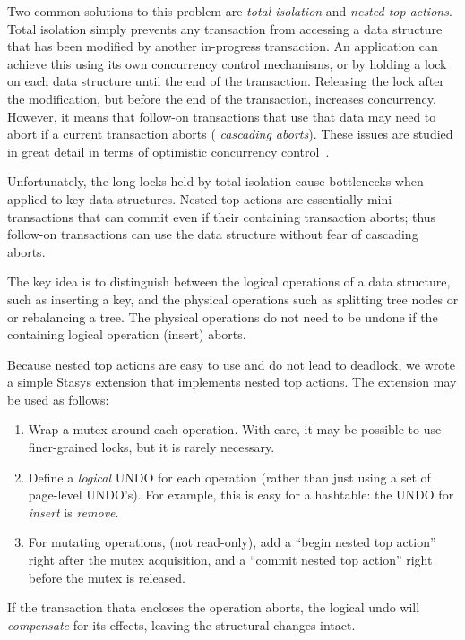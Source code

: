\documentclass[letterpaper,twocolumn,10pt]{article}
\newcommand{\yad}{Stasys\xspace}
\begin{document}
Two common solutions to this problem are {\em total isolation} and
{\em nested top actions}.  Total isolation simply prevents any
transaction from accessing a data structure that has been modified by
another in-progress transaction.  An application can achieve this
using its own concurrency control mechanisms, or by holding a lock on
each data structure until the end of the transaction.  Releasing the
lock after the modification, but before the end of the transaction,
increases concurrency.  However, it means that follow-on transactions that use
that data may need to abort if a current transaction aborts ({\em
cascading aborts}).  These issues are studied in great detail in terms of optimistic concurrency control~\cite{optimisticConcurrencyControl, optimisticConcurrenctPerformance}.

Unfortunately, the long locks held by total isolation cause bottlenecks when applied to key
data structures.
Nested top actions are essentially mini-transactions that can
commit even if their containing transaction aborts; thus follow-on
transactions can use the data structure without fear of cascading
aborts.  

The key idea is to distinguish between the logical operations of a
data structure, such as inserting a key, and the physical operations
such as splitting tree nodes or or rebalancing a tree. The physical
operations do not need to be undone if the containing logical operation
(insert) aborts.

Because nested top actions are easy to use and do not lead to 
deadlock, we wrote a simple \yad extension that
implements nested top actions.  The extension may be used as follows:

\begin{enumerate}
\item Wrap a mutex around each operation.  With care, it may be possible to use finer-grained locks, but it is rarely necessary.
\item Define a {\em logical} UNDO for each operation (rather than just using
  a set of page-level UNDO's).  For example, this is easy for a
  hashtable: the UNDO for {\em insert} is {\em remove}.
\item For mutating operations, (not read-only), add a ``begin nested
  top action'' right after the mutex acquisition, and a ``commit
  nested top action'' right before the mutex is released.
\end{enumerate}

\noindent If the transaction thata encloses the operation aborts, the logical
undo will {\em compensate} for its effects, leaving the structural
changes intact. 
\end{document}
